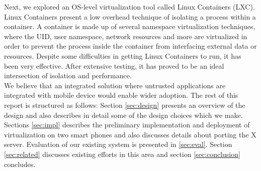 Next, we explored an OS-level virtualization tool called Linux Containers (LXC). Linux Containers present a low overhead technique of isolating a process within a container.  A container is made up of several namespace virtualization techniques, where the UID, user namespace, network resources and more are virtualized in order to prevent the process inside the container from interfacing external data or resources.  Despite some difficulties in getting Linux Containers to run, it has been very effective.  After extensive testing, it has proved to be an ideal intersection of isolation and performance. \\

We believe that an integrated solution where untrusted applications are integrated with mobile device would enable wider adoption. The rest of this report is structured as follows: Section \ref{sec:design} presents an overview of the design and also describes in detail some of the design choices which we make. Sections \ref{sec:impl} describes the preliminary implementation and deployment of virtualization on two smart phones and also discusses details about porting the X server. Evaluation of our existing system is presented in \ref{sec:eval}. Section \ref{sec:related} discusses existing efforts in this area and section \ref{sec:conclusion} concludes. \\

